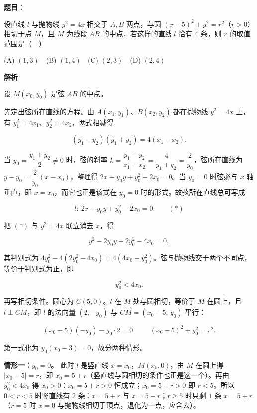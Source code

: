 \begin{answer}

\textbf{题目}：

设直线 \(l\) 与抛物线 \(y^2=4x\) 相交于 \(A,B\) 两点，与圆 \((x-5)^2+y^2=r^2\)（\(r>0\)）相切于点 \(M\)，且 \(M\) 为线段 \(AB\) 的中点．若这样的直线 \(l\) 恰有 4 条，则 \(r\) 的取值范围是（　）

(A) \((1,3)\)　(B) \((1,4)\)　(C) \((2,3)\)　(D) \((2,4)\)

\textbf{解析}

设 \(M(x_0,y_0)\) 是弦 \(AB\) 的中点。

先定出弦所在直线的方程。由 \(A(x_1,y_1)\)、\(B(x_2,y_2)\) 都在抛物线 \(y^2=4x\) 上，有 \(y_1^2=4x_1\)、\(y_2^2=4x_2\)，两式相减得

\nopagebreak[4]
\[
(y_1-y_2)(y_1+y_2)=4(x_1-x_2).
\]

当 \(y_0=\dfrac{y_1+y_2}{2}\neq0\) 时，弦的斜率 \(k=\dfrac{y_1-y_2}{x_1-x_2}=\dfrac{4}{y_1+y_2}=\dfrac{2}{y_0}\)，弦所在直线为 \(y-y_0=\dfrac{2}{y_0}(x-x_0)\)，整理得 \(2x-y_0y+y_0^2-2x_0=0\)。当 \(y_0=0\) 时弦必与 \(x\) 轴垂直，即 \(x=x_0\)，而它也正是该式在 \(y_0=0\) 时的形式。故弦所在直线总可写成

\nopagebreak[4]
\[
l:\ 2x-y_0y+y_0^2-2x_0=0.\qquad(\ast)
\]

把 \((\ast)\) 与 \(y^2=4x\) 联立消去 \(x\)，得

\nopagebreak[4]
\[
y^2-2y_0y+2y_0^2-4x_0=0,
\]

其判别式为 \(4y_0^2-4\left(2y_0^2-4x_0\right)=4\left(4x_0-y_0^2\right)\)。弦与抛物线交于两个不同点，等价于判别式为正，即

\nopagebreak[4]
\[
y_0^2<4x_0 .
\]

再写相切条件。圆心为 \(C(5,0)\)。\(l\) 在 \(M\) 处与圆相切，等价于 \(M\) 在圆上，且 \(l\perp CM\)，即 \(l\) 的法向量 \((2,-y_0)\) 与 \(\overrightarrow{CM}=(x_0-5,\ y_0)\) 平行：

\nopagebreak[4]
\[
(x_0-5)(-y_0)-y_0\cdot2=0,\qquad (x_0-5)^2+y_0^2=r^2 .
\]

第一式化为 \(y_0(x_0-3)=0\)，故分两种情形。

\textbf{情形一：\(y_0=0\)。} 此时 \(l\) 是竖直线 \(x=x_0\)，\(M(x_0,0)\)。由 \(M\) 在圆上得 \(|x_0-5|=r\)，即 \(x_0=5\pm r\)（竖直线与圆相切的条件也正是这一个）。再由 \(y_0^2<4x_0\) 得 \(x_0>0\)：\(x_0=5+r>0\) 恒成立；\(x_0=5-r>0\) 即 \(r<5\)。所以 \(0<r<5\) 时竖直线有 \(2\) 条：\(x=5+r\) 与 \(x=5-r\)；\(r\geqslant5\) 时只剩 \(1\) 条 \(x=5+r\)（\(r=5\) 时 \(x=0\) 与抛物线相切于顶点，退化为一点，应舍去）。


\end{answer}
